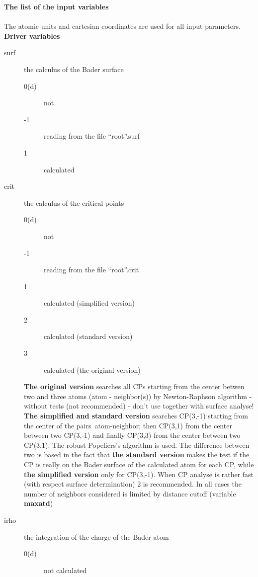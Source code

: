 \documentclass[11pt]{article}
\begin{document}
{\large \bf \centering The list of the input variables}\\ \\
The atomic units and cartesian coordinates are used for all input
parameters. \\

{\bf \centering  Driver variables}\\
\begin{description}
\item [surf] the calculus of the Bader surface
  \begin{description}
    \item [0(d)] not
    \item [-1] reading from the file ``root''.surf
    \item [1] calculated 
  \end{description} 
\item [crit] the calculus of the critical points
  \begin{description}
    \item [0(d)] not
    \item [-1] reading from the file ``root''.crit
    \item [1] calculated (simplified version)
    \item [2] calculated (standard version) 
    \item [3] calculated (the original version)
  \end{description} 
  {\bf The original version} searches all CPs starting from the center betwen 
  two and three atoms (atom - neighbor(s)) by
  Newton-Raphson algorithm - without tests (not recommended) - don't
  use together with surface analyse! 
{\bf The simplified and standard version} searches CP(3,-1) starting
  from the center of the pairs~atom-neighbor; then CP(3,1) from the
  center between two CP(3,-1) and finally CP(3,3) from the center 
  between two CP(3,1). The robust Popeliers's algorithm is used. 
  The difference between two is based in the fact 
  that {\bf the standard version} makes the test if the CP is really 
  on the Bader surface of the calculated atom for each CP, while 
  {\bf the simplified version} only for CP(3,-1). When CP analyse is
  rather fast (with respect surface determination) 2 is recommended.
  In all cases the number of neighbors considered is limited by
  distance cutoff (variable {\bf maxatd})  
\item [irho] the integration of the charge of the Bader atom    
  \begin{description}
    \item [0(d)] not calculated

\end{description}
\end{description}
\end{document}
